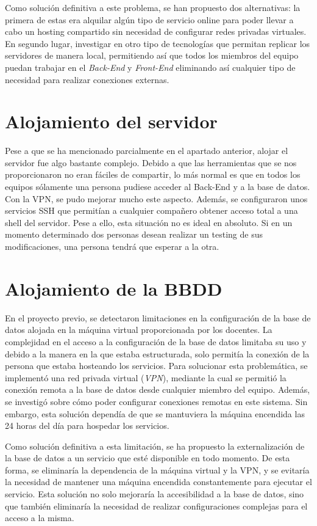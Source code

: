 \documentclass[12pt]{report}
\begin{document}
Como solución definitiva a este problema, se han propuesto dos alternativas: la primera de estas era alquilar algún tipo de servicio online para poder llevar a cabo un hosting compartido sin necesidad de configurar redes privadas virtuales. En segundo lugar, investigar en otro tipo de tecnologías que permitan replicar los servidores de manera local, permitiendo así que todos los miembros del equipo puedan trabajar en el \textit{Back-End} y \textit{Front-End} eliminando así cualquier tipo de necesidad para realizar conexiones externas.
\section{Alojamiento del servidor}
Pese a que se ha mencionado parcialmente en el apartado anterior, alojar el servidor fue algo bastante complejo. Debido a que las herramientas que se nos proporcionaron no eran fáciles de compartir, lo más normal es que en todos los equipos sólamente una persona pudiese acceder al Back-End y a la base de datos. Con la VPN, se pudo mejorar mucho este aspecto. Además, se configuraron unos servicios SSH que permitían a cualquier compañero obtener acceso total a una shell del servidor. Pese a ello, esta situación no es ideal en absoluto. Si en un momento determinado dos personas desean realizar un testing de sus modificaciones, una persona tendrá que esperar a la otra.
\section{Alojamiento de la BBDD}
En el proyecto previo, se detectaron limitaciones en la configuración de la base de datos alojada en la máquina virtual proporcionada por los docentes. La complejidad en el acceso a la configuración de la base de datos limitaba su uso y  debido a la manera en la que estaba estructurada, solo permitía la conexión de la persona que estaba hosteando los servicios. Para solucionar esta problemática, se implementó una red privada virtual (\textit{VPN}), mediante la cual se permitió la conexión remota a la base de datos desde cualquier miembro del equipo. Además, se investigó sobre cómo poder configurar conexiones remotas en este sistema. Sin embargo, esta solución dependía de que se mantuviera la máquina encendida las 24 horas del día para hospedar los servicios.

Como solución definitiva a esta limitación, se ha propuesto la externalización de la base de datos a un servicio que esté disponible en todo momento. De esta forma, se eliminaría la dependencia de la máquina virtual y la VPN, y se evitaría la necesidad de mantener una máquina encendida constantemente para ejecutar el servicio. Esta solución no solo mejoraría la accesibilidad a la base de datos, sino que también eliminaría la necesidad de realizar configuraciones complejas para el acceso a la misma.
\end{document}
